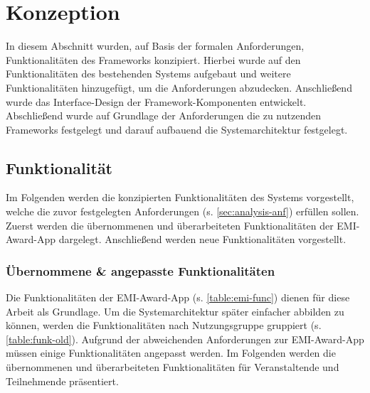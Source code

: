 \chapter{Konzeption} \label{chapter:conception}

In diesem Abschnitt wurden, auf Basis der formalen Anforderungen,
Funktionalitäten des Frameworks konzipiert. Hierbei wurde auf den
Funktionalitäten des bestehenden Systems aufgebaut und weitere Funktionalitäten
hinzugefügt, um die Anforderungen abzudecken. Anschließend wurde das
Interface-Design der Frame\-work-Kom\-po\-nen\-ten entwickelt. Abschließend wurde
auf Grundlage der Anforderungen die zu nutzenden Frameworks festgelegt und
darauf aufbauend die Systemarchitektur festgelegt.

\section{Funktionalität} \label{sec:concept-func}

Im Folgenden werden die konzipierten Funktionalitäten des Systems
vorgestellt, welche die zuvor festgelegten Anforderungen (s.
\autoref{sec:analysis-anf}) erfüllen sollen. Zuerst werden die übernommenen und
überarbeiteten Funktionalitäten der EMI-Award-App dargelegt. Anschließend werden
neue Funktionalitäten vorgestellt.

\subsection{Übernommene \& angepasste Funktionalitäten}

Die Funktionalitäten der EMI-Award-App (s. \autoref{table:emi-func}) dienen für
diese Arbeit als Grundlage. Um die Systemarchitektur später einfacher abbilden
zu können, werden die Funktionalitäten nach Nutzungsgruppe gruppiert (s.
\autoref{table:funk-old}). Aufgrund der abweichenden Anforderungen zur
EMI-Award-App müssen einige Funktionalitäten angepasst werden. Im Folgenden
werden die übernommenen und überarbeiteten Funktionalitäten für Veranstaltende
und Teilnehmende präsentiert.

